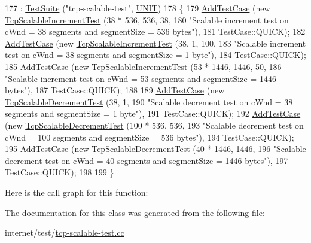 \begin{DoxyCode}
177                           : \hyperlink{classns3_1_1TestSuite_a904b0c40583b744d30908aeb94636d1a}{TestSuite} (\textcolor{stringliteral}{"tcp-scalable-test"}, \hyperlink{classns3_1_1TestSuite_a1ebfcab34ec8161e085e8e3a1855eae0a3885375a3787abf60431f8454b3cadbd}{UNIT})
178   \{
179     \hyperlink{classns3_1_1TestCase_a3718088e3eefd5d6454569d2e0ddd835}{AddTestCase} (\textcolor{keyword}{new} \hyperlink{classTcpScalableIncrementTest}{TcpScalableIncrementTest} (38 * 536, 536, 38,
180                                                \textcolor{stringliteral}{"Scalable increment test on cWnd = 38 segments and
       segmentSize = 536 bytes"}),
181                  TestCase::QUICK);
182     \hyperlink{classns3_1_1TestCase_a3718088e3eefd5d6454569d2e0ddd835}{AddTestCase} (\textcolor{keyword}{new} \hyperlink{classTcpScalableIncrementTest}{TcpScalableIncrementTest} (38, 1, 100,
183                                                \textcolor{stringliteral}{"Scalable increment test on cWnd = 38 segments and
       segmentSize = 1 byte"}),
184                  TestCase::QUICK);
185     \hyperlink{classns3_1_1TestCase_a3718088e3eefd5d6454569d2e0ddd835}{AddTestCase} (\textcolor{keyword}{new} \hyperlink{classTcpScalableIncrementTest}{TcpScalableIncrementTest} (53 * 1446, 1446, 50,
186                                                \textcolor{stringliteral}{"Scalable increment test on cWnd = 53 segments and
       segmentSize = 1446 bytes"}),
187                  TestCase::QUICK);
188 
189     \hyperlink{classns3_1_1TestCase_a3718088e3eefd5d6454569d2e0ddd835}{AddTestCase} (\textcolor{keyword}{new} \hyperlink{classTcpScalableDecrementTest}{TcpScalableDecrementTest} (38, 1,
190                                                \textcolor{stringliteral}{"Scalable decrement test on cWnd = 38 segments and
       segmentSize = 1 byte"}),
191                  TestCase::QUICK);
192     \hyperlink{classns3_1_1TestCase_a3718088e3eefd5d6454569d2e0ddd835}{AddTestCase} (\textcolor{keyword}{new} \hyperlink{classTcpScalableDecrementTest}{TcpScalableDecrementTest} (100 * 536, 536,
193                                                \textcolor{stringliteral}{"Scalable decrement test on cWnd = 100 segments and
       segmentSize = 536 bytes"}),
194                  TestCase::QUICK);
195     \hyperlink{classns3_1_1TestCase_a3718088e3eefd5d6454569d2e0ddd835}{AddTestCase} (\textcolor{keyword}{new} \hyperlink{classTcpScalableDecrementTest}{TcpScalableDecrementTest} (40 * 1446, 1446,
196                                                \textcolor{stringliteral}{"Scalable decrement test on cWnd = 40 segments and
       segmentSize = 1446 bytes"}),
197                  TestCase::QUICK);
198 
199   \}
\end{DoxyCode}


Here is the call graph for this function\+:




The documentation for this class was generated from the following file\+:\begin{DoxyCompactItemize}
\item 
internet/test/\hyperlink{tcp-scalable-test_8cc}{tcp-\/scalable-\/test.\+cc}\end{DoxyCompactItemize}
